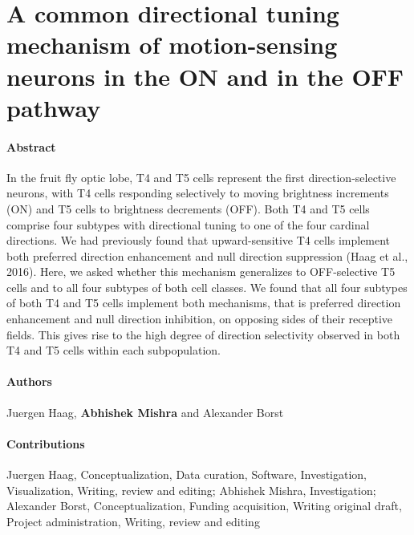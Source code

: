 \section{A common directional tuning mechanism of  motion-sensing neurons in the ON and in the OFF pathway}
\label{sct:manuscript_haag_mishra}


\paragraph{Abstract}
In the fruit fly optic lobe, T4 and T5 cells represent the first direction-selective neurons, with T4 cells responding selectively to moving brightness increments (ON) and T5 cells to brightness decrements (OFF). Both T4 and T5 cells comprise four subtypes with directional tuning to one of the four cardinal directions. We had previously found that upward-sensitive T4 cells implement both preferred direction enhancement and null direction suppression (Haag et al., 2016). Here, we asked whether this mechanism generalizes to OFF-selective T5 cells and to all four subtypes of both cell classes. We found that all four subtypes of both T4 and T5 cells implement both mechanisms, that is preferred direction enhancement and null direction inhibition, on opposing sides of their receptive fields. This gives rise to the high degree of direction selectivity observed in both T4 and T5 cells within each subpopulation.


\paragraph{Authors} Juergen Haag, \textbf{Abhishek Mishra} and Alexander Borst

\paragraph{Contributions}
Juergen Haag, Conceptualization, Data curation, Software, Investigation, Visualization, Writing, review and editing; Abhishek Mishra, Investigation; Alexander Borst, Conceptualization, Funding acquisition, Writing original draft, Project administration, Writing, review and editing

\cleardoublepage

